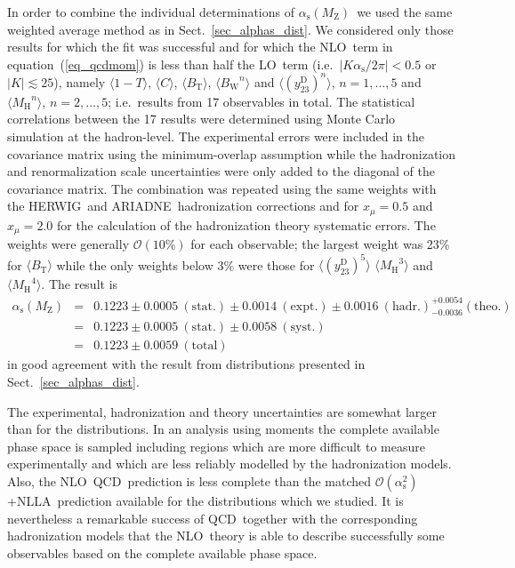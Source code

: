 \documentclass[12pt,a4paper,twoside]{article}
\newcommand{\as}     {\ensuremath{\alpha_{\mathrm{s}}}}
\newcommand{\asmz}   {\ensuremath{\alpha_{\mathrm{s}}(\mz)}}
\newcommand{\oaa}    {\ensuremath{\mathcal{O}(\alpha_{\mathrm{s}}^2)}}
\newcommand{\mz}     {\ensuremath{M_{\mathrm{Z}}}}
\newcommand{\bt}     {\ensuremath{B_{\mathrm{T}}}}
\newcommand{\bw}     {\ensuremath{B_{\mathrm{W}}}}
\newcommand{\cp}     {\ensuremath{C}}
\newcommand{\mh}     {\ensuremath{M_{\mathrm{H}}}}
\newcommand{\thr}    {\ensuremath{1-T}}
\newcommand{\momone}[1] {\mbox{\ensuremath{\langle#1\rangle}}}
\newcommand{\momn}[2] {\mbox{\ensuremath{\langle#1^{#2}\rangle}}}
\newcommand{\xmu}    {\ensuremath{x_{\mu}}}
\newcommand{\ytwothree}   {\ensuremath{y^{\mathrm{D}}_{23}}}
\newcommand{\qcd}{\mbox{QCD}}
\newcommand{\nlla}{\mbox{NLLA}}
\newcommand{\lo}{\mbox{LO}}
\newcommand{\nlo}{\mbox{NLO}}
\newcommand{\Herwig}{\mbox{HERWIG}}
\newcommand{\Ariadne}{\mbox{ARIADNE}}
\begin{document}
In order to combine the individual determinations of \asmz\ we used the
same weighted average method as in Sect.~\ref{sec_alphas_dist}.  
We considered only
those results for which the fit was successful and for which
the \nlo\ term in equation~(\ref{eq_qcdmom}) is less than half the \lo\ 
term (i.e.\  $|K\as/2\pi|<0.5$ or $|K|\lesssim 25$), 
namely \momone{\thr},
\momone{\cp}, \momone{\bt}, \momn{\bw}{n} and \momn{(\ytwothree)}{n},
$n=1,\ldots,5$ and \momn{\mh}{n}, $n=2,\ldots,5$; i.e.\ results from 17
observables in total.  The statistical correlations between the 17
results were determined using Monte Carlo simulation at the
hadron-level.  The experimental errors were included in the covariance
matrix using the minimum-overlap assumption while the hadronization
and renormalization scale uncertainties were only added to the diagonal
of the covariance matrix.  The combination was repeated using the same
weights with the \Herwig\ and \Ariadne\ hadronization corrections and for
$\xmu=0.5$ and $\xmu=2.0$ for the calculation of the hadronization
theory systematic errors.  
The weights were generally $\mathcal{O}(10\%)$ for each observable;
the largest weight was 23\% for \momone{\bt} while the only weights below 
3\% were those for \momn{(\ytwothree)}{5} \momn{\mh}{3} and \momn{\mh}{4}. 
The result is
\begin{displaymath}
\begin{array}{rcl}
\asmz & = & 0.1223
\pm0.0005~\mathrm{(stat.)}
\pm0.0014~\mathrm{(expt.)}
\pm0.0016~\mathrm{(hadr.)}
^{+0.0054}
_{-0.0036}
\mathrm{(theo.)}\\
& = & 0.1223
\pm0.0005~\mathrm{(stat.)}
\pm0.0058~\mathrm{(syst.)} \\
& = & 0.1223
\pm0.0059~\mathrm{(total)}
\end{array}
\end{displaymath}
in good agreement with the result from distributions 
presented in Sect.~\ref{sec_alphas_dist}.  

The experimental, hadronization and theory uncertainties are somewhat
larger than for the distributions.  
In an analysis using moments the complete available phase
space is sampled including regions which are more difficult to measure
experimentally and which are less reliably modelled by the hadronization
models.  Also, the \nlo\ \qcd\ prediction is less complete than the
matched \oaa+\nlla\ prediction available for the distributions which we
studied.  
It is nevertheless a remarkable success of \qcd\ together 
with the corresponding 
hadronization models that the \nlo\ theory is able to describe 
successfully
some observables based on the complete available phase space.  
\end{document}

